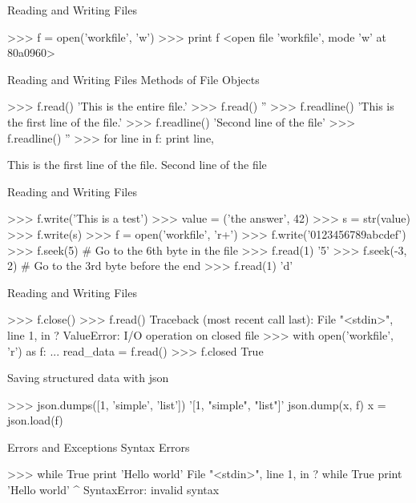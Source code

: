 \documentclass[11pt]{beamer}
\begin{document}
\begin{frame}[containsverbatim]{Reading and Writing Files}
\begin{python}
>>> f = open('workfile', 'w')
>>> print f
<open file 'workfile', mode 'w' at 80a0960>
\end{python}
\end{frame}

\begin{frame}[containsverbatim]{Reading and Writing Files}
Methods of File Objects
\begin{python}
>>> f.read()
'This is the entire file.\n'
>>> f.read()
''
>>> f.readline()
'This is the first line of the file.\n'
>>> f.readline()
'Second line of the file\n'
>>> f.readline()
''
>>> for line in f:
        print line,

This is the first line of the file.
Second line of the file
\end{python}
\end{frame}


\begin{frame}[containsverbatim]{Reading and Writing Files}
\begin{python}
>>> f.write('This is a test\n')
>>> value = ('the answer', 42)
>>> s = str(value)
>>> f.write(s)
>>> f = open('workfile', 'r+')
>>> f.write('0123456789abcdef')
>>> f.seek(5)     # Go to the 6th byte in the file
>>> f.read(1)
'5'
>>> f.seek(-3, 2) # Go to the 3rd byte before the end
>>> f.read(1)
'd'
\end{python}
\end{frame}


\begin{frame}[containsverbatim]{Reading and Writing Files}
\begin{python}
>>> f.close()
>>> f.read()
Traceback (most recent call last):
  File "<stdin>", line 1, in ?
ValueError: I/O operation on closed file
>>> with open('workfile', 'r') as f:
...    read_data = f.read()
>>> f.closed
True
\end{python}
\end{frame}

\begin{frame}[containsverbatim]{Saving structured data with json}
\begin{python}
>>> json.dumps([1, 'simple', 'list'])
'[1, "simple", "list"]'
json.dump(x, f)
x = json.load(f)
\end{python}
\end{frame}


\begin{frame}[containsverbatim]{Errors and Exceptions}
Syntax Errors
\begin{python}
>>> while True print 'Hello world'
  File "<stdin>", line 1, in ?
    while True print 'Hello world'
                   ^
SyntaxError: invalid syntax
\end{python}
\end{frame}
\end{document}

